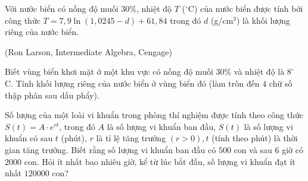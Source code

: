 \begin{bt}%
	Với nước biển có nồng độ muối $30\%$, nhiệt độ  $T$ ($^\circ$C) của nước biển được tính bởi công thức $T = 7{,}9\ln (1{,}0245 - d) + 61{,}84$ trong đó $d$ (g/cm$^3$) là khối lượng riêng của nước biển.
	\begin{flushright}
		(Ron  Larson, Intermediate Algebra, Cengage)
	\end{flushright}
	Biết vùng biển khơi mặt ở một khu vực có nồng độ muối $30\%$ và  nhiệt độ là $8^\circ$ C. Tính khối lượng riêng của nước biển ở vùng biển đó (làm tròn đến $4$ chữ số thập phân sau dấu phẩy).
\end{bt}

\begin{ex}%
	Số lượng của một loài vi khuẩn trong phòng thí nghiệm được tính theo công thức $S(t)=A\cdot e^{rt}$, trong đó $A$ là số lượng vi khuẩn ban đầu, $S(t)$ là số lượng vi khuẩn có  sau $t$ (phút), $r$ là tỉ lệ tăng trưởng $(r>0), t$ (tính theo phút) là thời gian tăng trưởng. Biết rằng số lượng vi khuẩn ban đầu có $500$ con và sau $6$ giờ có $2000$ con. Hỏi ít nhất bao nhiêu giờ, kể từ lúc bắt đầu, số lượng vi khuẩn đạt ít nhất $120000$ con?
\end{ex}

